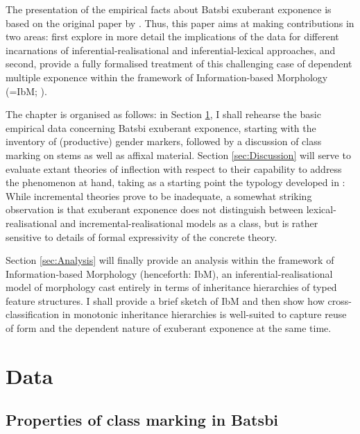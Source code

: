 \documentclass[output=paper]{langsci/langscibook}
\begin{document}
The presentation of the empirical facts about Batsbi exuberant
exponence is based on the original paper by
\citet{Harris09}. Thus, this paper aims at making contributions in
two areas: first explore in more detail the implications of the
data for different incarnations of inferential-realisational and
inferential-lexical approaches, and second, provide a fully
formalised treatment of this challenging case of dependent multiple exponence
within the framework of Information-based Morphology (=IbM;
\citealp{Crysmann:Bonami:2016}).

The chapter is organised as follows: in Section \ref{sec:Data}, I
shall rehearse the basic empirical data concerning Batsbi exuberant
exponence, starting with the inventory of (productive) gender markers,
followed by a discussion of class marking on stems as well as  
affixal material. %
Section \ref{sec:Discussion} will serve to evaluate extant theories of
inflection with respect to their capability to address the phenomenon
at hand, taking as a starting point the typology developed in
\citet{Stump01}: While incremental theories prove to be inadequate, a
somewhat striking observation is that exuberant exponence does not
distinguish between lexical-realisational and
incremental-realisational models as a class, but is rather sensitive
to details of formal expressivity of the concrete theory.

Section \ref{sec:Analysis} will finally provide an analysis within the
framework of Information-based Morphology (henceforth: IbM), an
inferential-realisational model of morphology cast entirely in terms
of inheritance hierarchies of typed feature structures. I shall
provide a brief sketch of IbM and then show how cross-classification
in monotonic inheritance hierarchies is well-suited to capture reuse of form and
the dependent nature of exuberant exponence at the same time.

\section{Data}
\label{sec:Data}

\subsection{Properties of class marking in Batsbi}
\end{document}
